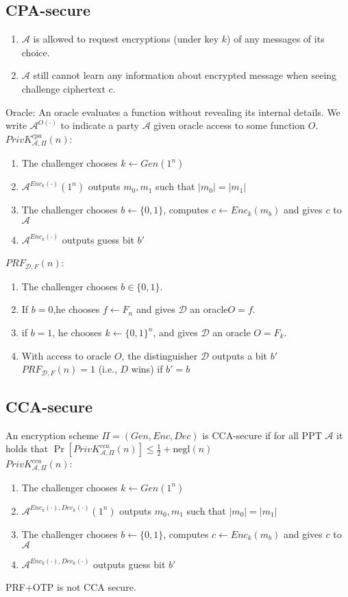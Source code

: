 \subsection*{CPA-secure}
\begin{enumerate}
  \item $\mathcal{A}$ is allowed to request encryptions (under key $k$) of any messages of its choice.
  \item $\mathcal{A}$ still cannot learn any information about encrypted message when seeing challenge ciphertext $c$.
\end{enumerate}
Oracle: An oracle evaluates a function without revealing its internal details.
We write $\mathcal{A}^{O(\cdot)}$ to indicate a party 
$\mathcal{A}$ given oracle access to some function $O$.
$PrivK^{cpa}_{\mathcal{A},\Pi}(n)$:
\begin{enumerate}
  \item The challenger chooses $k\leftarrow Gen(1^n)$
  \item $\mathcal{A}^{Enc_k(\cdot)}(1^n)$ outputs $m_0, m_1$ such that
  $|m_0|=|m_1|$
  \item The challenger chooses $b\leftarrow\{0,1\}$, 
  computes $c \leftarrow Enc_k(m_b)$ and gives $c$ to $\mathcal{A}$
  \item $\mathcal{A}^{Enc_k(\cdot)}$ outputs guess bit $b'$
\end{enumerate}
$PRF_{\mathcal{D},F}(n)$:
\begin{enumerate}
  \item The challenger chooses $b \in \{0,1\}$.
  \item If $b=0$,he chooses $f \leftarrow F_n$ and 
  gives $\mathcal{D}$ an oracle$ O=f$.
  \item if $b = 1$, he chooses $k \leftarrow \{0,1\}^n$, and 
  gives $\mathcal{D}$ an oracle $O = F_k$.
  \item With access to oracle $O$, the distinguisher $\mathcal{D}$ outputs 
  a bit $b'$ $PRF_{\mathcal{D},F}(n) = 1$ (i.e., $D$ wins) if $b' = b$
\end{enumerate}

\subsection*{CCA-secure}
An encryption scheme $\Pi=(Gen,Enc,Dec)$ is CCA-secure if for all PPT $\mathcal{A}$ it holds that 
$\Pr[PrivK^{cca}_{\mathcal{A},\Pi}(n)]\le\frac{1}{2}+\text{negl}(n)$\\
$PrivK^{cca}_{\mathcal{A},\Pi}(n)$:
\begin{enumerate}
  \item The challenger chooses $k\leftarrow Gen(1^n)$
  \item $\mathcal{A}^{Enc_k(\cdot),Dec_k(\cdot)}(1^n)$ outputs $m_0, m_1$ such that
  $|m_0|=|m_1|$
  \item The challenger chooses $b\leftarrow\{0,1\}$, 
  computes $c \leftarrow Enc_k(m_b)$ and gives $c$ to $\mathcal{A}$
  \item $\mathcal{A}^{Enc_k(\cdot),Dec_k(\cdot)}$ outputs guess bit $b'$
\end{enumerate}
PRF+OTP is not CCA secure.\\



